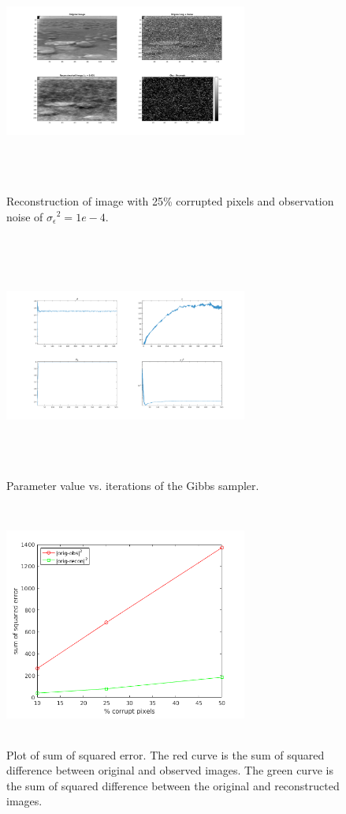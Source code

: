 \documentclass[a4paper,10pt]{article}
\def\sigmaeps{{\sigma_{\epsilon}}}
\begin{document}
\begin{figure}[H]
 \centering
 \includegraphics[width=8cm, height=8cm]{image_n25.png}
 \caption{Reconstruction of image with 25\% corrupted pixels and observation noise of $\sigmaeps^2 = 1e-4$.}
 \label{fig:img25}
\end{figure}
\begin{figure}[H]
 \centering
 \includegraphics[width=8cm, height=8cm]{params_n25.png}
 \caption{Parameter value vs. iterations of the Gibbs sampler.}
 \label{fig:param25}
\end{figure}

\begin{figure}[H]
 \centering
 \includegraphics[width=8cm, height=8cm]{sse.png}
 \caption{Plot of sum of squared error. The red curve is the sum of squared difference between original and observed images. The green curve is the sum of squared difference between the original and reconstructed images.}
 \label{fig:sse}
\end{figure}
\end{document}
